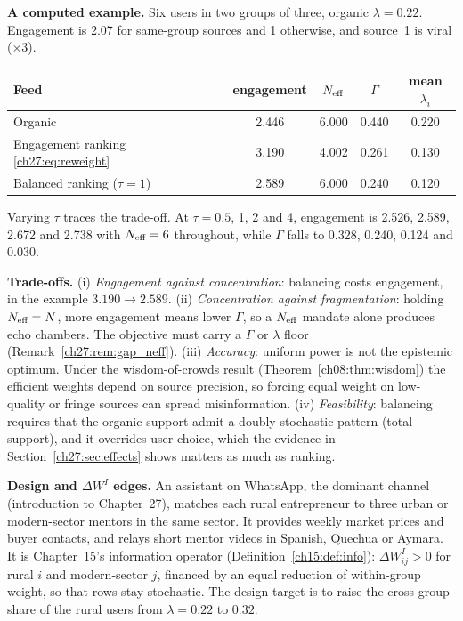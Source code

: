 \documentclass[../solutions_manual.tex]{subfiles}
\begin{document}
 \textbf{A computed example.} Six users in two groups of three, organic $\lambda = 0.22$. Engagement is 2.07 for same-group sources and 1 otherwise, and source~1 is viral ($\times3$).
\begin{center}
\begin{tabular}{lcccc}
\toprule
Feed & engagement & $N_{\text{eff}}$ & $\Gamma$ & mean $\lambda_i$ \\
\midrule
Organic & 2.446 & 6.000 & 0.440 & 0.220 \\
Engagement ranking \eqref{ch27:eq:reweight} & 3.190 & 4.002 & 0.261 & 0.130 \\
Balanced ranking ($\tau = 1$) & 2.589 & 6.000 & 0.240 & 0.120 \\
\bottomrule
\end{tabular}
\end{center}
Varying $\tau$ traces the trade-off. At $\tau = 0.5$, 1, 2 and 4, engagement is 2.526, 2.589, 2.672 and 2.738 with $N_{\text{eff}} = 6$ throughout, while $\Gamma$ falls to 0.328, 0.240, 0.124 and 0.030.

 \textbf{Trade-offs.} (i) \emph{Engagement against concentration}: balancing costs engagement, in the example $3.190 \to 2.589$. (ii) \emph{Concentration against fragmentation}: holding $N_{\text{eff}} = N$, more engagement means lower $\Gamma$, so a $N_{\text{eff}}$ mandate alone produces echo chambers. The objective must carry a $\Gamma$ or $\lambda$ floor (Remark~\ref{ch27:rem:gap_neff}). (iii) \emph{Accuracy}: uniform power is not the epistemic optimum. Under the wisdom-of-crowds result (Theorem~\ref{ch08:thm:wisdom}) the efficient weights depend on source precision, so forcing equal weight on low-quality or fringe sources can spread misinformation. (iv) \emph{Feasibility}: balancing requires that the organic support admit a doubly stochastic pattern (total support), and it overrides user choice, which the evidence in Section~\ref{ch27:sec:effects} shows matters as much as ranking.


 \textbf{Design and $\Delta W^I$ edges.} An assistant on WhatsApp, the dominant channel (introduction to Chapter~27), matches each rural entrepreneur to three urban or modern-sector mentors in the same sector. It provides weekly market prices and buyer contacts, and relays short mentor videos in Spanish, Quechua or Aymara. It is Chapter~15's information operator (Definition~\ref{ch15:def:info}): $\Delta W^I_{ij} > 0$ for rural $i$ and modern-sector $j$, financed by an equal reduction of within-group weight, so that rows stay stochastic. The design target is to raise the cross-group share of the rural users from $\lambda = 0.22$ to $0.32$.
\end{document}
